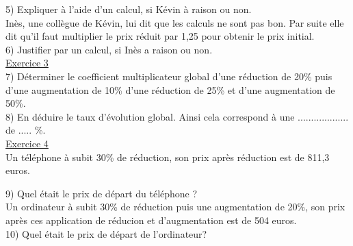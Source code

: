 \documentclass[french]{book}
\begin{document}
5) Expliquer à l'aide d'un calcul, si Kévin à raison ou non.\\

Inès, une collègue de Kévin, lui dit que les calculs ne sont pas bon. Par suite elle dit qu'il faut multiplier le prix réduit par 1,25 pour obtenir le prix initial. \\

6) Justifier par un calcul, si Inès a raison ou non.\\

\underline{Exercice 3} \\ 

7) Déterminer le coefficient multiplicateur global d'une réduction de 20\% puis d'une augmentation de 10\% d'une réduction de 25\% et d'une augmentation de 50\%. \\

8) En déduire le taux d'évolution global. Ainsi cela correspond à une ................... de ..... \%.\\

\underline{Exercice 4} \\

Un téléphone à subit 30\% de réduction, son prix après réduction est de 811,3 euros.

9) Quel était le prix de départ du téléphone ? \\

Un ordinateur à subit 30\% de réduction puis une augmentation de 20\%, son prix après ces application de réducion et d'augmentation est de 504 euros.\\

10) Quel était le prix de départ de l'ordinateur?
 
 
\end{document}
